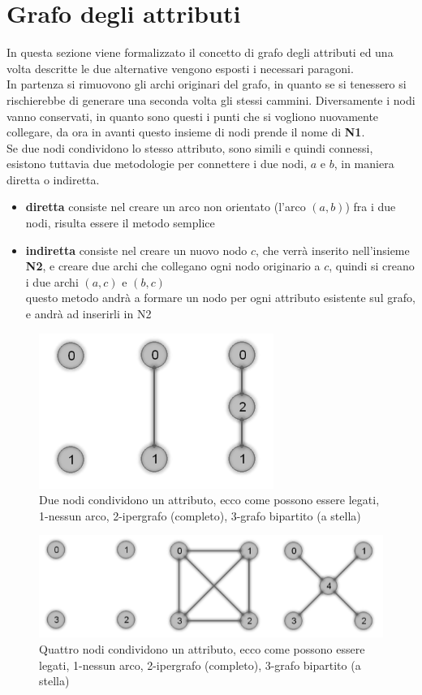 \section{Grafo degli attributi}
In questa sezione viene formalizzato il concetto di grafo degli attributi ed una volta descritte le due alternative vengono esposti i necessari paragoni.\\
In partenza si rimuovono gli archi originari del grafo, in quanto se si tenessero si rischierebbe di generare una seconda volta gli stessi cammini. Diversamente i nodi vanno conservati, in quanto sono questi i punti che si vogliono nuovamente collegare, da ora in avanti questo insieme di nodi prende il nome di \textbf{N1}.\\
Se due nodi condividono lo stesso attributo, sono simili e quindi connessi, esistono tuttavia due metodologie per connettere i due nodi, $a$ e $b$, in maniera diretta o indiretta.
\begin{itemize}
	\item \textbf{diretta} consiste nel creare un arco non orientato (l'arco $(a, b)$) fra i due nodi, risulta essere il metodo semplice
	\item \textbf{indiretta} consiste nel creare un nuovo nodo $c$, che verrà inserito nell'insieme \textbf{N2}, e creare due archi che collegano ogni nodo originario a $c$, quindi si creano i due archi $(a, c)$ e $(b, c)$\\
	questo metodo andrà a formare un nodo per ogni attributo esistente sul grafo, e andrà ad inserirli in N2
\end{itemize}
%
\begin{figure}[htp]
	\centering
	\includegraphics{immagini/add_att2}
	\caption{Due nodi condividono un attributo, ecco come possono essere legati, 1-nessun arco, 2-ipergrafo (completo), 3-grafo bipartito (a stella)}
	\label{fig:add_att2}
\end{figure}
\begin{figure}[htp]
	\centering
	\includegraphics[width=\linewidth]{immagini/add_att4}
	\caption{Quattro nodi condividono un attributo, ecco come possono essere legati, 1-nessun arco, 2-ipergrafo (completo), 3-grafo bipartito (a stella)}
	\label{fig:add_att4}
\end{figure}
